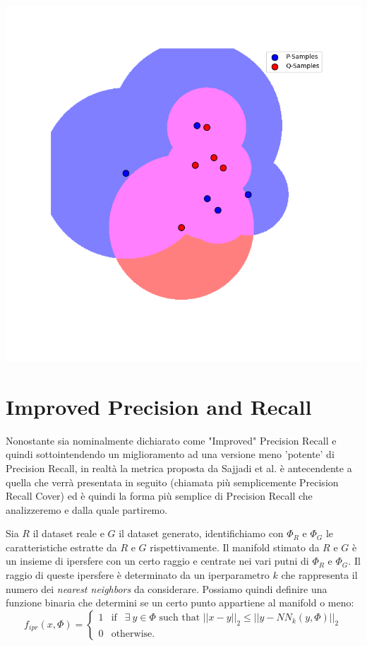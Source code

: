\includegraphics[width=\linewidth]{../manifold.png}

\section{Improved Precision and Recall}
\label{sec:improved-precision-and-recall}

Nonostante sia nominalmente dichiarato come "Improved" Precision Recall e quindi sottointendendo un miglioramento ad una versione meno 'potente' di Precision Recall, 
in realtà la metrica proposta da Sajjadi et al. \cite{sajjadi2018assessing} è antecendente a quella che verrà presentata in seguito (chiamata più semplicemente Precision Recall Cover)
ed è quindi la forma più semplice di Precision Recall che analizzeremo e dalla quale partiremo.

Sia $R$ il dataset reale e $G$ il dataset generato, identifichiamo con $\Phi_R$ e $\Phi_G$ le caratteristiche estratte da $R$ e $G$ rispettivamente.
Il manifold stimato da $R$ e $G$ è un insieme di ipersfere con un certo raggio e centrate nei vari putni di $\Phi_R$ e $\Phi_G$. Il raggio di queste ipersfere è 
determinato da un iperparametro $k$ che rappresenta il numero dei \textit{nearest neighbors} da considerare. Possiamo quindi definire una funzione binaria che 
determini se un certo punto appartiene al manifold o meno:
\begin{equation}
    f_{ipr}(x, \Phi) = 
    \begin{cases}
        1 & \text{if }~~ \exists ~ y \in \Phi \text{ such that } ||x - y||_2 \leq ||y - NN_k(y, \Phi)||_2 \\
        0 & \text{otherwise.}
    \end{cases}
\end{equation}

